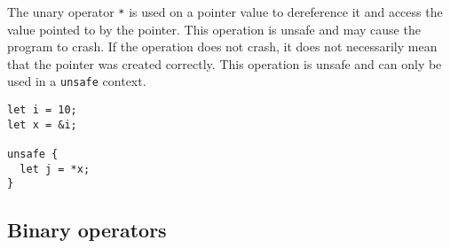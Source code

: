The unary operator \texttt{*} is used on a pointer value to dereference it and
access the value pointed to by the pointer. This operation is unsafe and may
cause the program to crash. If the operation does not crash, it does not
necessarily mean that the pointer was created correctly. This operation is
unsafe and can only be used in a \texttt{unsafe} context.

\begin{lstlisting}[style=coloredverbatim]
let i = 10;
let x = &i;

unsafe {
  let j = *x;
}
\end{lstlisting}

\subsection {Binary operators}

